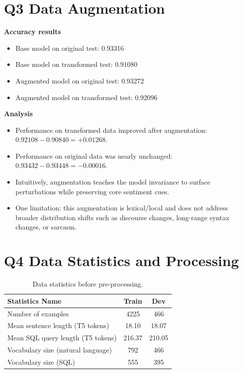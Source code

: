 \documentclass{article}
\begin{document}
\section*{Q3 Data Augmentation}
\textbf{Accuracy results}
\begin{itemize}
  \item Base model on original test: 0.93316
  \item Base model on transformed test: 0.91080
  \item Augmented model on original test: 0.93272
  \item Augmented model on transformed test: 0.92096
\end{itemize}

\textbf{Analysis}
\begin{itemize}
  \item Performance on transformed data improved after augmentation: $0.92108 - 0.90840 = +0.01268$.
  \item Performance on original data was nearly unchanged: $0.93432 - 0.93448 = -0.00016$.
  \item Intuitively, augmentation teaches the model invariance to surface perturbations while preserving
  core sentiment cues.
  \item One limitation: this augmentation is lexical/local and does not address broader distribution shifts
  such as discourse changes, long-range syntax changes, or sarcasm.
\end{itemize}

\section*{Q4 Data Statistics and Processing}
\begin{table}[h!]
\centering
\begin{tabular}{lcc}
\toprule
Statistics Name & Train & Dev \\
\midrule
Number of examples & 4225 & 466 \\
Mean sentence length (T5 tokens) & 18.10 & 18.07 \\
Mean SQL query length (T5 tokens) & 216.37 & 210.05 \\
Vocabulary size (natural language) & 792 & 466 \\
Vocabulary size (SQL) & 555 & 395 \\
\bottomrule
\end{tabular}
\caption{Data statistics before pre-processing.}
\label{tab:data_stats_before}
\end{table}
\end{document}
